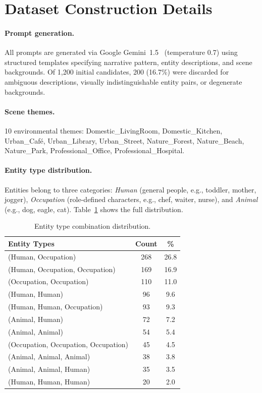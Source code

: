 \documentclass[sigconf,review,anonymous]{acmart}
\begin{document}
\section{Dataset Construction Details}
\label{app:dataset}

\paragraph{Prompt generation.}
All prompts are generated via Google Gemini~1.5~\cite{gemini} (temperature 0.7) using structured templates specifying narrative pattern, entity descriptions, and scene backgrounds.
Of 1,200 initial candidates, 200 (16.7\%) were discarded for ambiguous descriptions, visually indistinguishable entity pairs, or degenerate backgrounds.

\paragraph{Scene themes.}
10 environmental themes: Domestic\_LivingRoom, Domestic\_Kitchen, Urban\_Caf\'{e}, Urban\_Library, Urban\_Street, Nature\_Forest, Nature\_Beach, Nature\_Park, Professional\_Office, Professional\_Hospital.

\paragraph{Entity type distribution.}
Entities belong to three categories: \emph{Human} (general people, e.g., toddler, mother, jogger), \emph{Occupation} (role-defined characters, e.g., chef, waiter, nurse), and \emph{Animal} (e.g., dog, eagle, cat). Table~\ref{tab:entity_types} shows the full distribution.
\begin{table}[ht]
\caption{Entity type combination distribution.}
\label{tab:entity_types}
\centering
\small
\begin{tabular}{@{}lcc@{}}
\toprule
Entity Types & Count & \% \\
\midrule
(Human, Occupation)                    & 268 & 26.8 \\
(Human, Occupation, Occupation)        & 169 & 16.9 \\
(Occupation, Occupation)               & 110 & 11.0 \\
(Human, Human)                         & 96  & 9.6 \\
(Human, Human, Occupation)             & 93  & 9.3 \\
(Animal, Human)                        & 72  & 7.2 \\
(Animal, Animal)                       & 54  & 5.4 \\
(Occupation, Occupation, Occupation)   & 45  & 4.5 \\
(Animal, Animal, Animal)               & 38  & 3.8 \\
(Animal, Animal, Human)                & 35  & 3.5 \\
(Human, Human, Human)                  & 20  & 2.0 \\
\bottomrule
\end{tabular}
\end{table}
\end{document}
